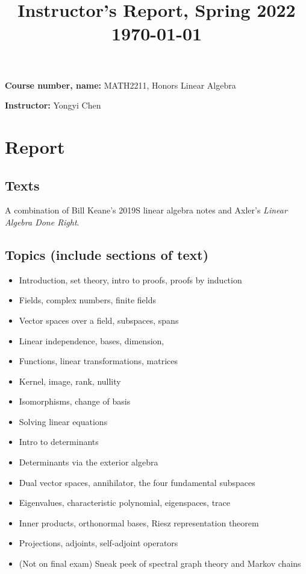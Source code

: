 \documentclass[11pt,oneside]{amsart}
\title{Instructor's Report, Spring 2022\\ \today}
\begin{document}
\maketitle

\bigskip

\textbf{Course number, name:} MATH2211, Honors Linear Algebra

\textbf{Instructor:} Yongyi Chen

\section{Report}
\subsection{Texts}
A combination of Bill Keane's 2019S linear algebra notes and Axler's \emph{Linear Algebra Done Right}. 

\subsection{Topics (include sections of text)}
\begin{itemize}
    \item Introduction, set theory, intro to proofs, proofs by induction
    \item Fields, complex numbers, finite fields
    \item Vector spaces over a field, subspaces, spans
    \item Linear independence, bases, dimension,
    \item Functions, linear transformations, matrices
    \item Kernel, image, rank, nullity
    \item Isomorphisms, change of basis
    \item Solving linear equations
    \item Intro to determinants
    \item Determinants via the exterior algebra
    \item Dual vector spaces, annihilator, the four fundamental subspaces
    \item Eigenvalues, characteristic polynomial, eigenspaces, trace
    \item Inner products, orthonormal bases, Riesz representation theorem
    \item Projections, adjoints, self-adjoint operators
    \item (Not on final exam) Sneak peek of spectral graph theory and Markov chains
\end{itemize}
\end{document}
